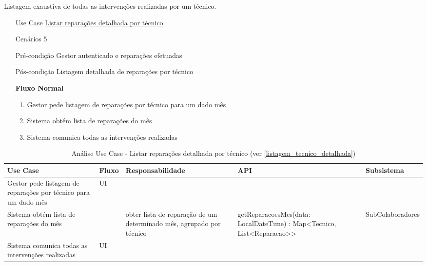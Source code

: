 \documentclass[../relatorio.tex]{subfiles}
\begin{document}
Listagem exaustiva de todas as intervenções realizadas por um técnico.
\begin{itemize}
    \item[Use Case] {\underline{Listar reparações detalhada por técnico}}
    \item[Cenários] {5}
    \item[Pré-condição] {Gestor autenticado e reparações efetuadas}
    \item[Pós-condição] {Listagem detalhada de reparações por técnico}
          \begin{flushleft}
              \textbf{Fluxo Normal}
          \end{flushleft}
          \begin{enumerate}
              \item Gestor pede listagem de reparações por técnico para um dado mês %
              \item Sistema obtém lista de reparações do mês %
              \item Sistema comunica todas as intervenções realizadas %
          \end{enumerate}
\end{itemize}
\begin{landscape}
    \begin{table}[!h]
        \centering
        \begin{tabular}{|p{5cm}|p{1cm}|p{4cm}|p{6cm}|p{4cm}|}
            \hline
            \rowcolor{gray!20!white}
            Use Case & Fluxo & Responsabilidade & API & Subsistema \\
            \hline
            \rowcolor{yellow}
            Gestor pede listagem de reparações por técnico para um dado mês
                     & 
            UI
                     & 
                     & 
                     & 
            \\
            \hline
            Sistema obtém lista de reparações do mês
                     & 
                     & 
            obter lista de reparação de um determinado mês, agrupado por técnico
                     & 
            getReparacoesMes(data: LocalDateTime) : Map<Tecnico, List<Reparacao>>
                     & 
            SubColaboradores
            \\
            \hline
            \rowcolor{yellow}
            Sistema comunica todas as intervenções realizadas
                     & 
            UI
                     & 
                     & 
                     & 
            \\
        \end{tabular}
        \caption{Análise Use Case - Listar reparações detalhada por técnico (ver \ref{listagem_tecnico_detalhada})}
    \end{table}
\end{landscape}
\end{document}
